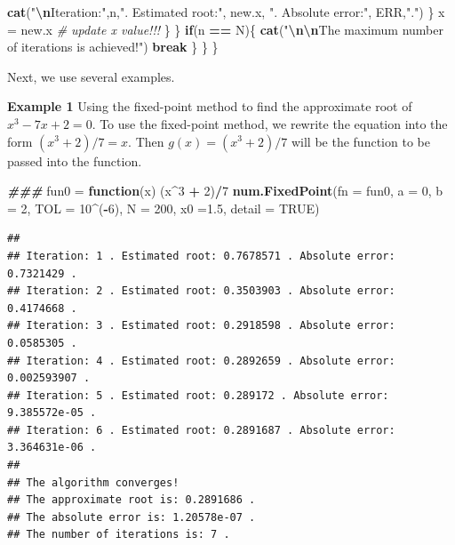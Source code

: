 \documentclass[
]{book}
\newenvironment{Shaded}{\begin{snugshade}}{\end{snugshade}}
\newcommand{\AttributeTok}[1]{\textcolor[rgb]{0.13,0.29,0.53}{#1}}
\newcommand{\CommentTok}[1]{\textcolor[rgb]{0.56,0.35,0.01}{\textit{#1}}}
\newcommand{\ConstantTok}[1]{\textcolor[rgb]{0.56,0.35,0.01}{#1}}
\newcommand{\ControlFlowTok}[1]{\textcolor[rgb]{0.13,0.29,0.53}{\textbf{#1}}}
\newcommand{\DecValTok}[1]{\textcolor[rgb]{0.00,0.00,0.81}{#1}}
\newcommand{\DocumentationTok}[1]{\textcolor[rgb]{0.56,0.35,0.01}{\textbf{\textit{#1}}}}
\newcommand{\FloatTok}[1]{\textcolor[rgb]{0.00,0.00,0.81}{#1}}
\newcommand{\FunctionTok}[1]{\textcolor[rgb]{0.13,0.29,0.53}{\textbf{#1}}}
\newcommand{\NormalTok}[1]{#1}
\newcommand{\OtherTok}[1]{\textcolor[rgb]{0.56,0.35,0.01}{#1}}
\newcommand{\SpecialCharTok}[1]{\textcolor[rgb]{0.81,0.36,0.00}{\textbf{#1}}}
\newcommand{\StringTok}[1]{\textcolor[rgb]{0.31,0.60,0.02}{#1}}
\begin{document}
\begin{Shaded}
\begin{Highlighting}[]
            \FunctionTok{cat}\NormalTok{(}\StringTok{"}\SpecialCharTok{\textbackslash{}n}\StringTok{Iteration:"}\NormalTok{,n,}\StringTok{". Estimated root:"}\NormalTok{, new.x, }\StringTok{". Absolute error:"}\NormalTok{, ERR,}\StringTok{"."}\NormalTok{)}
\NormalTok{          \}}
\NormalTok{         x }\OtherTok{=}\NormalTok{ new.x         }\CommentTok{\# update x value!!!}
\NormalTok{    \}}
\NormalTok{  \}}
  \ControlFlowTok{if}\NormalTok{(n }\SpecialCharTok{==}\NormalTok{ N)\{}
    \FunctionTok{cat}\NormalTok{(}\StringTok{"}\SpecialCharTok{\textbackslash{}n\textbackslash{}n}\StringTok{The maximum number of iterations is achieved!"}\NormalTok{)}
    \ControlFlowTok{break}
\NormalTok{  \} }
\NormalTok{ \}}
\NormalTok{\}}
\end{Highlighting}
\end{Shaded}

Next, we use several examples.

\textbf{Example 1} Using the fixed-point method to find the approximate root of \(x^3 - 7x +2 = 0\). To use the fixed-point method, we rewrite the equation into the form \((x^3 + 2)/7 = x\). Then \(g(x) = (x^3 + 2)/7\) will be the function to be passed into the function.

\begin{Shaded}
\begin{Highlighting}[]
\DocumentationTok{\#\#\#}
\NormalTok{fun0 }\OtherTok{=} \ControlFlowTok{function}\NormalTok{(x) (x}\SpecialCharTok{\^{}}\DecValTok{3} \SpecialCharTok{+} \DecValTok{2}\NormalTok{)}\SpecialCharTok{/}\DecValTok{7}
\FunctionTok{num.FixedPoint}\NormalTok{(}\AttributeTok{fn =}\NormalTok{ fun0, }\AttributeTok{a =} \DecValTok{0}\NormalTok{, }\AttributeTok{b =} \DecValTok{2}\NormalTok{, }\AttributeTok{TOL =} \DecValTok{10}\SpecialCharTok{\^{}}\NormalTok{(}\SpecialCharTok{{-}}\DecValTok{6}\NormalTok{), }\AttributeTok{N =} \DecValTok{200}\NormalTok{, }\AttributeTok{x0 =}\FloatTok{1.5}\NormalTok{, }\AttributeTok{detail =} \ConstantTok{TRUE}\NormalTok{)}
\end{Highlighting}
\end{Shaded}

\begin{verbatim}
## 
## Iteration: 1 . Estimated root: 0.7678571 . Absolute error: 0.7321429 .
## Iteration: 2 . Estimated root: 0.3503903 . Absolute error: 0.4174668 .
## Iteration: 3 . Estimated root: 0.2918598 . Absolute error: 0.0585305 .
## Iteration: 4 . Estimated root: 0.2892659 . Absolute error: 0.002593907 .
## Iteration: 5 . Estimated root: 0.289172 . Absolute error: 9.385572e-05 .
## Iteration: 6 . Estimated root: 0.2891687 . Absolute error: 3.364631e-06 .
## 
## The algorithm converges!
## The approximate root is: 0.2891686 .
## The absolute error is: 1.20578e-07 .
## The number of iterations is: 7 .
\end{verbatim}
\end{document}

